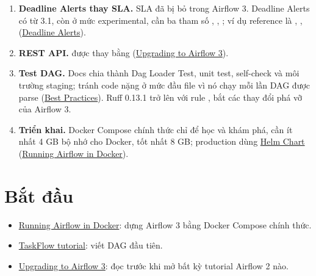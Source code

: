 \begin{enumerate}
  \item \textbf{Deadline Alerts thay SLA.} SLA đã bị bỏ trong Airflow 3. Deadline Alerts có từ 3.1, còn ở mức experimental, cần ba tham số , , ; ví dụ reference là , ,  (\href{https://airflow.apache.org/docs/apache-airflow/stable/howto/deadline-alerts.html}{Deadline Alerts}).
  \item \textbf{REST API.}  được thay bằng  (\href{https://airflow.apache.org/docs/apache-airflow/stable/installation/upgrading_to_airflow3.html}{Upgrading to Airflow 3}).
  \item \textbf{Test DAG.} Docs chia thành Dag Loader Test, unit test, self-check và môi trường staging; tránh code nặng ở mức đầu file vì nó chạy mỗi lần DAG được parse (\href{https://airflow.apache.org/docs/apache-airflow/stable/best-practices.html}{Best Practices}). Ruff 0.13.1 trở lên với rule ,  bắt các thay đổi phá vỡ của Airflow 3.
  \item \textbf{Triển khai.} Docker Compose chính thức chỉ để học và khám phá, cần ít nhất 4 GB bộ nhớ cho Docker, tốt nhất 8 GB; production dùng \href{https://airflow.apache.org/docs/helm-chart/stable/index.html}{Helm Chart} (\href{https://airflow.apache.org/docs/apache-airflow/stable/howto/docker-compose/index.html}{Running Airflow in Docker}).
\end{enumerate}

\section{Bắt đầu}
\begin{itemize}
  \item \href{https://airflow.apache.org/docs/apache-airflow/stable/howto/docker-compose/index.html}{Running Airflow in Docker}: dựng Airflow 3 bằng Docker Compose chính thức.
  \item \href{https://airflow.apache.org/docs/apache-airflow/stable/tutorial/taskflow.html}{TaskFlow tutorial}: viết DAG đầu tiên.
  \item \href{https://airflow.apache.org/docs/apache-airflow/stable/installation/upgrading_to_airflow3.html}{Upgrading to Airflow 3}: đọc trước khi mở bất kỳ tutorial Airflow 2 nào.
\end{itemize}

